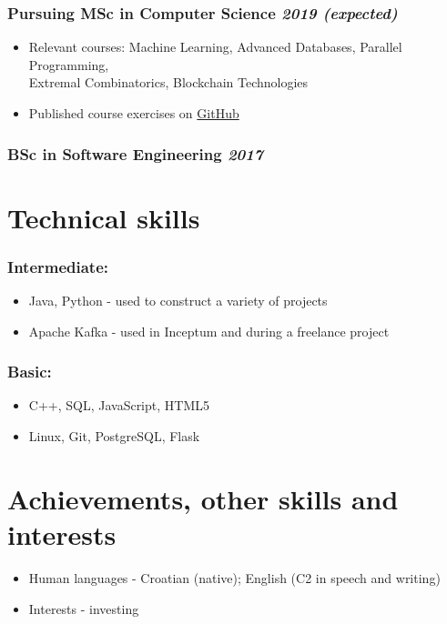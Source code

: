 \documentclass[a4paper]{article}
\newcommand{\bolditalicpair}
[2]
{\textbf{#1} \texorpdfstring{\hfill}{} \textit{#2}}
\begin{document}
\subsubsection{\bolditalicpair{Pursuing MSc in Computer Science}{2019 (expected)}}

\begin{itemize}
  \item Relevant courses: Machine Learning, Advanced Databases, Parallel Programming, \\
  Extremal Combinatorics, Blockchain Technologies
  \item Published course exercises on \href{https://github.com/MislavJaksic/College-Labs}{GitHub}
\end{itemize}

\subsubsection{\bolditalicpair{BSc in Software Engineering}{2017}}



\section{Technical skills}
\subsubsection{\bolditalicpair{Intermediate:}{}}

\begin{itemize}
  \item Java, Python - used to construct a variety of projects
  \item Apache Kafka - used in Inceptum and during a freelance project
\end{itemize}

\subsubsection{\bolditalicpair{Basic:}{}}

\begin{itemize}
  \item C++, SQL, JavaScript, HTML5
  \item Linux, Git, PostgreSQL, Flask
\end{itemize}



\section{Achievements, other skills and interests}

\begin{itemize}
  \item Human languages - Croatian (native); English (C2 in speech and writing)
  \item Interests - investing
\end{itemize}
\end{document}
